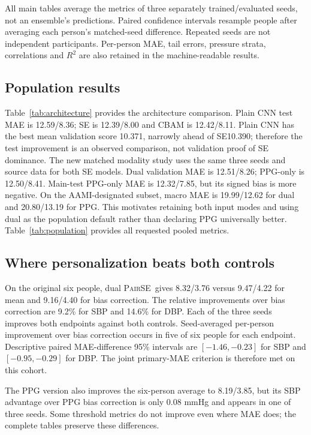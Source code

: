 \documentclass[conference]{IEEEtran}
\newcommand{\pair}{\textsc{PairSE}}
\begin{document}
All main tables average the metrics of three separately trained/evaluated
seeds, not an ensemble's predictions. Paired confidence intervals resample
people after averaging each person's matched-seed difference. Repeated seeds
are not independent participants. Per-person MAE, tail errors, pressure strata,
correlations and $R^2$ are also retained in the machine-readable results.

\subsection{Population results}
Table~\ref{tab:architecture} provides the architecture comparison. Plain CNN
test MAE is 12.59/8.36; SE is 12.39/8.00 and CBAM is 12.42/8.11. Plain CNN
has the best mean validation score 10.371, narrowly ahead of SE10.390;
therefore the test improvement is an observed comparison, not validation proof
of SE dominance. The new matched modality study uses the same three seeds
and source data for both SE models. Dual validation MAE is 12.51/8.26;
PPG-only is 12.50/8.41. Main-test PPG-only MAE is 12.32/7.85, but its signed
bias is more negative. On the AAMI-designated subset, macro MAE is 19.99/12.62
for dual and 20.80/13.19 for PPG. This motivates retaining both input modes
and using dual as the population default rather than declaring PPG universally
better. Table~\ref{tab:population} provides all requested pooled metrics.

\subsection{Where personalization beats both controls}
On the original six people, dual \pair\ gives 8.32/3.76 versus 9.47/4.22 for
mean and 9.16/4.40 for bias correction. The relative improvements over bias
correction are 9.2\% for SBP and 14.6\% for DBP. Each of the three seeds
improves both endpoints against both controls. Seed-averaged per-person
improvement over bias correction occurs in five of six people for each
endpoint. Descriptive paired MAE-difference 95\% intervals are
$[-1.46,-0.23]$ for SBP and $[-0.95,-0.29]$ for DBP. The joint primary-MAE
criterion is therefore met on this cohort.

The PPG version also improves the six-person average to 8.19/3.85, but its
SBP advantage over PPG bias correction is only 0.08 mmHg and appears in one
of three seeds. Some threshold metrics do not improve even where MAE does;
the complete tables preserve these differences.
\end{document}
